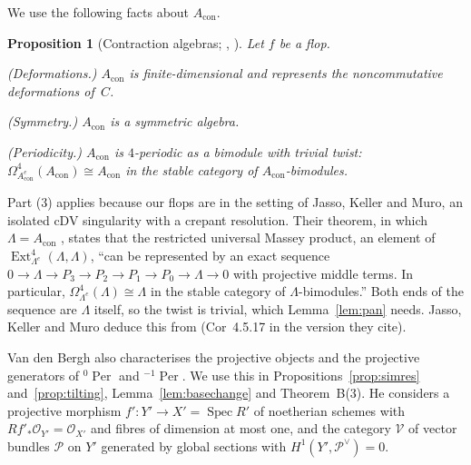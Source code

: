 \documentclass[11pt]{amsart}
\makeatletter
\numberwithin{table}{section}
\numberwithin{figure}{section}
\numberwithin{equation}{section}
\newtheorem{prop}[thm]{Proposition}
\theoremstyle{definition}
\theoremstyle{plain}
\newcommand{\Acon}{A_{\mathrm{con}}}
\newcommand{\cO}{\mathcal{O}}
\DeclareMathOperator{\Spec}{Spec}
\DeclareMathOperator{\Ext}{Ext}
\DeclareMathOperator{\Per}{Per}
\renewcommand\paragraph{\@startsection{paragraph}{4}{\z@}{\medskipamount}{-.5em}{\normalfont\bfseries}}
\makeatother
\begin{document}
We use the following facts about $\Acon$.

\begin{prop}[{Contraction algebras; \cite[Thms~1.1, 1.2]{DW}, \cite[\S1.2, Thm~3.2.5]{JKM}}]\label{prop:Acon}
Let $f$ be a flop.
\begin{thmlist}
\item (Deformations.) $\Acon$ is finite-dimensional and represents the noncommutative deformations of~$C$.
\item (Symmetry.) $\Acon$ is a symmetric algebra.
\item (Periodicity.) $\Acon$ is $4$-periodic as a bimodule with trivial twist: $\Omega^4_{\Acon^e}(\Acon) \cong \Acon$ in the stable category of $\Acon$-bimodules.
\end{thmlist}
\end{prop}

Part (3) applies because our flops are in the setting of Jasso, Keller and Muro, an isolated cDV singularity with a crepant resolution. Their theorem, in which $\Lambda = \Acon$ \cite[Setting~3.2.1]{JKM}, states that the restricted universal Massey product, an element of $\Ext^4_{\Lambda^e}(\Lambda, \Lambda)$, ``can be represented by an exact sequence $0 \to \Lambda \to P_3 \to P_2 \to P_1 \to P_0 \to \Lambda \to 0$ with projective middle terms. In particular, $\Omega^4_{\Lambda^e}(\Lambda) \cong \Lambda$ in the stable category of $\Lambda$-bimodules.'' Both ends of the sequence are $\Lambda$ itself, so the twist is trivial, which Lemma~\ref{lem:pan} needs. Jasso, Keller and Muro deduce this from \cite[Cor~4.5.18]{JM} (Cor~4.5.17 in the version they cite).

\paragraph{Perverse sheaves.} Van den Bergh also characterises the projective objects and the projective generators of ${}^{0}\Per$ and ${}^{-1}\Per$. We use this in Propositions~\ref{prop:simres} and~\ref{prop:tilting}, Lemma~\ref{lem:basechange} and Theorem~B(3). He considers a projective morphism $f'\colon Y' \to X' = \Spec R'$ of noetherian schemes with $Rf'_*\cO_{Y'} = \cO_{X'}$ and fibres of dimension at most one, and the category $\mathcal V$ of vector bundles $\mathcal P$ on $Y'$ generated by global sections with $H^1(Y', \mathcal P^\vee) = 0$.
\end{document}

